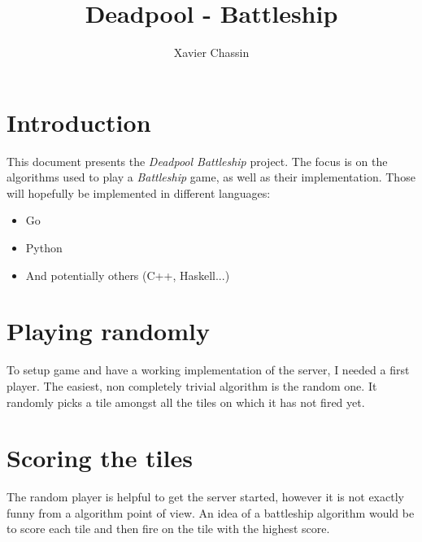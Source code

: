 \documentclass[a4paper]{article}
\begin{document}
\title{Deadpool - Battleship}
\author{Xavier Chassin}
\maketitle


\printglossary[title=Notations]


\section{Introduction} %
\label{sec:introduction}

This document presents the \emph{Deadpool Battleship} project. The focus is on the algorithms used to play a \emph{Battleship} game, as well as their implementation. Those will hopefully be implemented in different languages:
\begin{itemize}
\item Go
\item Python
\item And potentially others (C++, Haskell...)
\end{itemize}


\section{Playing randomly} %
\label{sec:playing_randomly}

To setup game and have a working implementation of the server, I needed a first player. The easiest, non completely trivial algorithm is the random one. It randomly picks a tile amongst all the tiles on which it has not fired yet.


\section{Scoring the tiles} %
\label{sec:scoring_the_tiles}

The random player is helpful to get the server started, however it is not exactly funny from a algorithm point of view. An idea of a battleship algorithm would be to score each tile and then fire on the tile with the highest score.
\end{document}
